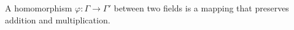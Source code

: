 A homomorphism $\varphi: \Gamma \rightarrow \Gamma'$ between two fields is a mapping that preserves addition and multiplication.
